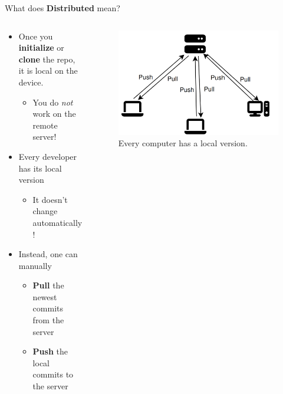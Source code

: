 \documentclass[compress,aspectratio=169]{beamer}
\begin{document}
  \begin{frame}{What does \textbf{Distributed} mean?}
    \begin{columns}
      \begin{column}{0.5\textwidth}
        \begin{itemize}
          \item Once you \textbf{initialize} or \textbf{clone} the repo, it is local on the device.
            \begin{itemize}
              \item You do \emph{not} work on the remote server!
            \end{itemize}
            \pause
          \item Every developer has its local version
            \begin{itemize}
              \item It doesn't change automatically!
            \end{itemize}
            \pause
          \item Instead, one can manually
            \begin{itemize}
              \item \textbf{Pull} the newest commits from the server
              \item \textbf{Push} the local commits to the server
            \end{itemize}
        \end{itemize}
      \end{column}
      \begin{column}{0.5\textwidth}
        \pause
        \begin{figure}
          \includegraphics[width=\textwidth]{./assets/dist.png}
          \caption{Every computer has a local version.}
        \end{figure}
      \end{column}
    \end{columns}
  \end{frame}
\end{document}
